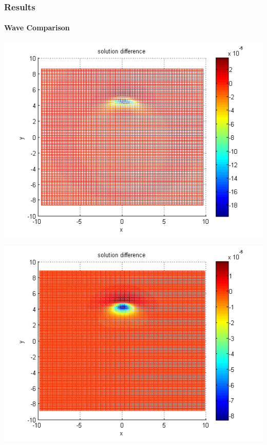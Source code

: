 \documentclass{beamer}
\begin{document}
\begin{frame}
\frametitle{Results}
\framesubtitle{Wave Comparison}
\begin{center}\vspace{0.4cm}
	\begin{minipage}[b]{0.32\linewidth}
		 \includegraphics[width=\linewidth]{figures/compare_30_bt3_c045_h020.png}
	\end{minipage}	
	\begin{minipage}[b]{0.32\linewidth}
		\includegraphics[width=\linewidth]{figures/compare_30_bt3_c045_h010.png}
	\end{minipage}	
	\begin{minipage}[b]{0.32\linewidth}		

\end{minipage}
\end{center}
\end{frame}
\end{document}
